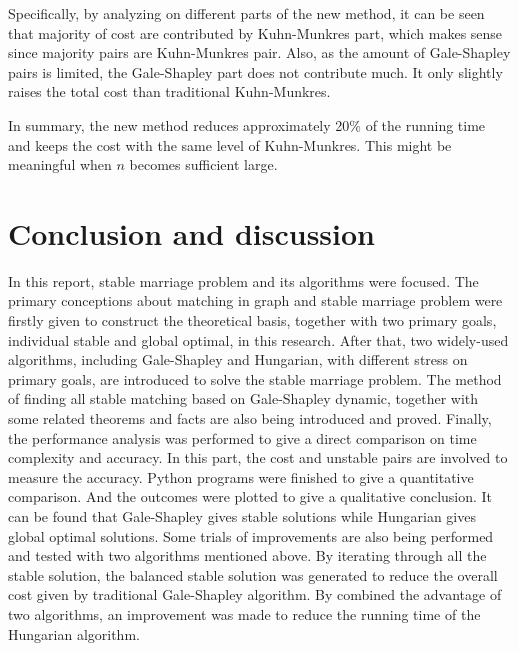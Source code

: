 \documentclass[14pt]{extarticle}
\begin{document}
Specifically, by analyzing on different parts of the new method, 
it can be seen that majority of cost are contributed by Kuhn-Munkres part, which makes sense since majority pairs are Kuhn-Munkres pair.
Also, as the amount of Gale-Shapley pairs is limited, the Gale-Shapley part does not contribute much.
It only slightly raises the total cost than traditional Kuhn-Munkres.

In summary, the new method reduces approximately 20\% of the running time and keeps the cost with the same level of Kuhn-Munkres.
This might be meaningful when $n$ becomes sufficient large.

\section{Conclusion and discussion}

In this report, stable marriage problem and its algorithms were focused. 
The primary conceptions about matching in graph and stable marriage problem were firstly given to construct the theoretical basis, together with two primary goals, individual stable and global optimal, in this research.
After that, two widely-used algorithms, including Gale-Shapley and Hungarian, with different stress on primary goals, are introduced to solve the stable marriage problem.
The method of finding all stable matching based on Gale-Shapley dynamic, together with some related theorems and facts are also being introduced and proved.
Finally, the performance analysis was performed to give a direct comparison on time complexity and accuracy. 
In this part, the cost and unstable pairs are involved to measure the accuracy. Python programs were finished to give a quantitative comparison. 
And the outcomes were plotted to give a qualitative conclusion.
It can be found that Gale-Shapley gives stable solutions while Hungarian gives global optimal solutions.
Some trials of improvements are also being performed and tested with two algorithms mentioned above. 
By iterating through all the stable solution, the balanced stable solution was generated to reduce the overall cost given by traditional Gale-Shapley algorithm.
By combined the advantage of two algorithms, an improvement was made to reduce the running time of the Hungarian algorithm.
\end{document}
